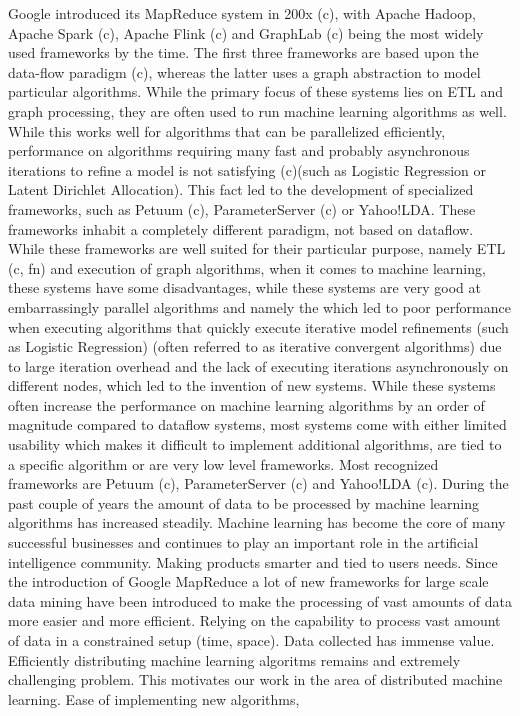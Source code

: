 Google introduced its MapReduce system in 200x (c), with Apache Hadoop, Apache Spark (c), Apache Flink (c) and GraphLab (c) being the most widely used frameworks by the time. The first three frameworks are based upon the data-flow paradigm (c), whereas the latter uses a graph abstraction to model particular algorithms. While the primary focus of these systems lies on ETL and graph processing, they are often used to run machine learning algorithms as well. While this works well for algorithms that can be parallelized efficiently, performance on algorithms requiring many fast and probably asynchronous iterations to refine a model is not satisfying (c)(such as Logistic Regression or Latent Dirichlet Allocation). This fact led to the development of specialized frameworks, such as Petuum (c), ParameterServer (c) or Yahoo!LDA. These frameworks inhabit a completely different paradigm, not based on dataflow. While these frameworks are well suited for their particular purpose, namely ETL (c, fn) and execution of graph algorithms, when it comes to machine learning, these systems have some disadvantages, while these systems are very good at embarrassingly parallel algorithms and  namely the which led to poor performance when executing algorithms that quickly execute iterative model refinements (such as Logistic Regression) (often referred to as iterative convergent algorithms) due to large iteration overhead and the lack of executing iterations asynchronously on different nodes, which led to the invention of new systems. While these systems often increase the performance on machine learning algorithms by an order of magnitude compared to dataflow systems, most systems come with either limited usability which makes it difficult to implement additional algorithms, are tied to a specific algorithm or are very low level frameworks. Most recognized frameworks are Petuum (c), ParameterServer (c) and Yahoo!LDA (c).
During the past couple of years the amount of data to be processed by machine learning algorithms has increased steadily. Machine learning has become the core of many successful businesses and continues to play an important role in the artificial intelligence community. Making products smarter and tied to users needs. Since the introduction of Google MapReduce a lot of new frameworks for large scale data mining have been introduced to make the processing of vast amounts of data more easier and more efficient. Relying on the capability to process vast amount of data in a constrained setup (time, space). Data collected has immense value.
Efficiently distributing machine learning algoritms remains and extremely challenging problem. This motivates our work in the area of distributed machine learning. Ease of implementing new algorithms, 


